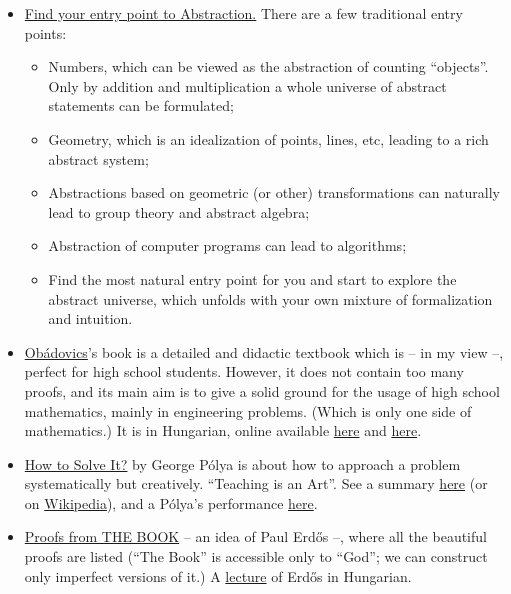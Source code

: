 \documentclass{article}
\begin{document}
\begin{itemize}
    \item \underline{Find your entry point to Abstraction.}
    There are a few traditional entry points:
    \begin{itemize}
        \item Numbers, which can be viewed as the abstraction of counting ``objects''. Only by addition and multiplication a whole universe of abstract statements can be formulated;
        \item Geometry, which is an idealization of points, lines, etc, leading to a rich abstract system;
        \item Abstractions based on geometric (or other) transformations can naturally lead to group theory and abstract algebra;
        \item Abstraction of computer programs can lead to algorithms;
        \item Find the most natural entry point for you and start to explore the abstract universe, which unfolds with your own mixture of formalization and intuition.
    \end{itemize}

    \item \href{https://moly.hu/konyvek/obadovics-j-gyula-matematika}{Obádovics}'s book is a detailed and didactic textbook which is -- in my view --, perfect for high school students. However, it does not contain too many proofs, and its main aim is to give a solid ground for the usage of high school mathematics, mainly in engineering problems. (Which is only one side of mathematics.) It is in Hungarian, online available \href{https://www.scribd.com/document/351926211/Obadovics-J-Gyula-Matematika-pdf}{here} and \href{https://datagrid.hu/boda/Boda-sajat/Rush/Matek/obadovics_matematika.pdf}{here}.

    \item \href{https://www.goodreads.com/book/show/192221.How_to_Solve_It}{How to Solve It?} by George Pólya is about how to approach a problem systematically but creatively. ``Teaching is an Art''. See a summary \href{https://web.archive.org/web/20240406172342/https://math.berkeley.edu/~gmelvin/polya.pdf}{here} (or on \href{https://en.wikipedia.org/wiki/How_to_Solve_It}{Wikipedia}), and a Pólya's performance \href{https://www.youtube.com/watch?v=h0gbw-Ur_do}{here}.
    
    \item \href{https://www.goodreads.com/book/show/696238.Proofs_from_THE_BOOK}{Proofs from THE BOOK} -- an idea of Paul Erdős --, where all the beautiful proofs are listed (``The Book'' is accessible only to ``God''; we can construct only imperfect versions of it.) A \href{https://www.youtube.com/watch?v=-oxfHwSzoM4}{lecture} of Erdős in Hungarian.


\end{itemize}
\end{document}
